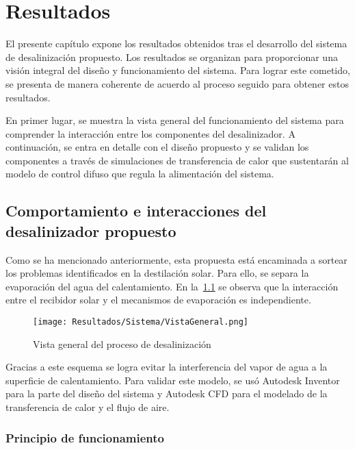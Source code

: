 \chapter{Resultados}

	El presente capítulo expone los resultados obtenidos tras el desarrollo del sistema de desalinización propuesto. Los resultados se organizan para proporcionar una visión integral del diseño y funcionamiento del sistema. Para lograr este cometido, se presenta de manera coherente de acuerdo al proceso seguido para obtener estos resultados.
	
	En primer lugar, se muestra la vista general del funcionamiento del sistema para comprender la interacción entre los componentes del desalinizador. A continuación, se entra en detalle con el diseño propuesto y se validan los componentes a través de simulaciones de transferencia de calor que sustentarán al modelo de control difuso que regula la alimentación del sistema.

	
	\section{Comportamiento e interacciones del desalinizador propuesto}
	
		Como se ha mencionado anteriormente, esta propuesta está encaminada a sortear los problemas identificados en la destilación solar. Para ello, se separa la evaporación del agua del calentamiento. En la~\cref{fig:VistaGeneral} se observa que la interacción entre el recibidor solar y el mecanismos de evaporación es independiente.
	
		\begin{figure}
			\centering
			\texttt{[image: Resultados/Sistema/VistaGeneral.png]}
			\caption{Vista general del proceso de desalinización}
			\label{fig:VistaGeneral}
		\end{figure}
		
		Gracias a este esquema se logra evitar la interferencia del vapor de agua a la superficie de calentamiento. Para validar este modelo, se usó Autodesk Inventor para la parte del diseño del sistema y Autodesk CFD para el modelado de la transferencia de calor y el flujo de aire.
		
		\subsection{Principio de funcionamiento}
			
